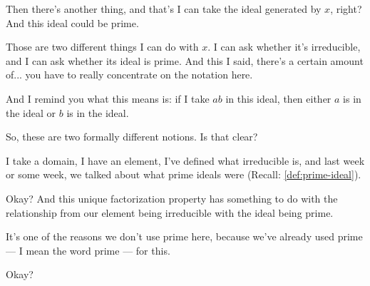 \begin{speech}[00:30:11 - 00:32:16]
Then there's another thing, and that's I can take the ideal generated by $x$,  right? And this ideal could be prime. 

Those are two different things I can do with $x$. I can ask whether it's irreducible, and I can ask whether its ideal is prime. And this I said, there's a certain amount of... you have to really concentrate on the notation here.

And I remind you what this means is: if I take $a b$ in this ideal,  then either $a$ is in the ideal  or $b$ is in the ideal. 

So, these are two formally different notions. Is that clear?

I take a domain, I have an element, I've defined what irreducible is, and last week or some week, we talked about what prime ideals were (Recall: \cref{def:prime-ideal}).

Okay? And this unique factorization property has something to do with the relationship from our element being irreducible with the ideal being prime.

It's one of the reasons we don't use prime here,  because we've already used prime --- I mean the word prime --- for this. 

Okay?
\end{speech}


